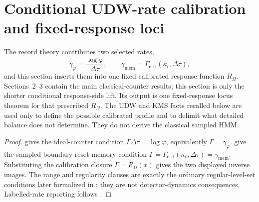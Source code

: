 \section{Conditional UDW-rate calibration and fixed-response loci}\label{sec:kms-shells}

\newcommand{\ModelAClause}{Under Model A (\Cref{ass:udw-rate-calibration-main}), }
\newcommand{\ResponseStandingClause}{Under Model A and the standing response-side hypotheses of \Cref{ass:response-standing-main}, }

The record theory contributes two selected rates,
\[
\gamma_\varphi=\frac{\log\varphi}{\Delta\tau},
\qquad
\gamma_{\mathrm{mem}}=\Gamma_{\mathrm{crit}}(\kappa_{\mathrm r},\Delta\tau),
\]
and this section inserts them into one fixed calibrated response function
$R_\Omega$. Sections~2--3 contain the main classical-counter results;
this section is only the shorter conditional response-side lift. Its output is
one fixed-response locus theorem for that prescribed $R_\Omega$. The UDW and KMS
facts recalled below are used only to define the possible calibrated profile and
to delimit what detailed balance does not determine. They do not derive the
classical sampled HMM.

\begin{corollary}\label{cor:conditional-calibration-bridge-main}
\leavevmode\par\smallskip
\noindent{}
\end{corollary}

\begin{proof}
 gives the ideal-counter condition
$\Gamma\Delta\tau=\log\varphi$, equivalently
$\Gamma=\gamma_\varphi$. 
give the sampled boundary-reset memory condition
$\Gamma=\Gamma_{\mathrm{crit}}(\kappa_{\mathrm r},\Delta\tau)
=\gamma_{\mathrm{mem}}$. Substituting the calibration closure
$\Gamma=R_\Omega(x)$ gives the two displayed inverse images. The range and
regularity clauses are exactly the ordinary regular-level-set conditions later
formalized in ; they are not detector-dynamics
consequences.  Labelled-rate reporting follows
.
\end{proof}

